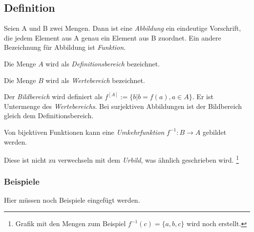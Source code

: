 \subsection{Definition}
Seien A und B zwei Mengen.
Dann ist eine \emph{Abbildung} ein eindeutige Vorschrift, die jedem Element aus A genau ein Element aus B zuordnet.
Ein andere Bezeichnung für Abbildung ist \emph{Funktion}.

Die Menge $A$ wird als \emph{Definitionsbereich} bezeichnet.

Die Menge $B$ wird als \emph{Wertebereich} bezeichnet.

Der \emph{Bildbereich} wird definiert als
$ f^{ [A] }:=\{b | b=f(a) , a \in A \}$.
Er ist Untermenge des \emph{Wertebereichs}. Bei surjektiven Abbildungen
ist der Bildbereich gleich dem Definitionsbereich.

Von bijektiven Funktionen kann eine \emph{Umkehrfunktion} $f^{-1} : {B}\rightarrow{A} $ gebildet werden.

Diese ist nicht zu verwechseln mit dem \emph{Urbild}, was ähnlich geschrieben wird.
\footnote{Grafik mit den Mengen zum Beispiel $ f^{-1}(c) = \{a,b,c\} $  wird noch erstellt.}

\subsubsection*{Beispiele}
Hier müssen noch Beispiele eingefügt werden.